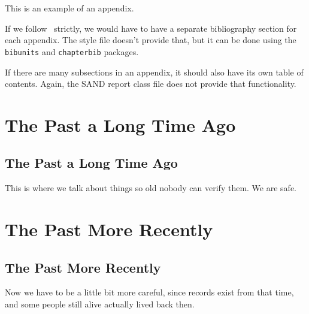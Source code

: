     This is an example of an appendix.

    If we follow~\cite{Sand98-0730} strictly, we would have to have
    a separate bibliography section for each appendix.  The style
    file doesn't provide that, but it can be done using the {\tt
    bibunits} and {\tt chapterbib} packages.

    If there are many subsections in an appendix, it should also
    have its own table of contents. Again, the SAND report class
    file does not provide that functionality.

       {
	\section{The Past a Long Time Ago}
    }{
	\subsection{The Past a Long Time Ago}
    }
	This is where we talk about things so old nobody can verify
	them. We are safe.

       {
	\section{The Past More Recently}
    }{
	\subsection{The Past More Recently}
    }
	Now we have to be a little bit more careful, since records
	exist from that time, and some people still alive actually
	lived back then.
